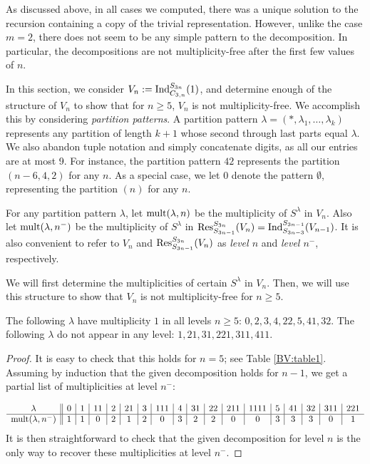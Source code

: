 As discussed above, in all cases we computed, there was a unique
solution to the recursion containing a copy of the trivial representation.
However, unlike the case $m=2$, there does not seem to be any simple pattern to the decomposition.
In particular, the decompositions are not multiplicity-free after the first few values of $n$.

In this section, we consider $V_n := \textup{Ind}_{C_{3,n}}^{S_{3n}}(1)$, and determine enough of the structure of $V_n$ to show that
for $n \ge 5$, $V_n$ is not multiplicity-free. We accomplish this by considering {\em partition patterns}. A partition pattern $\lambda = (*,\lambda_1,\ldots,\lambda_k)$ represents any partition of length $k+1$ whose second through last parts equal $\lambda$. We also abandon tuple notation and simply concatenate digits, as all our entries are at most 9. For instance, the partition pattern $42$ represents the partition $(n-6,4,2)$ for any $n$. As a special case, we let $0$ denote the pattern $\emptyset$, representing the partition $(n)$ for any $n$.

For any partition pattern $\lambda$, let $\textup{mult}(\lambda,n)$ be the multiplicity of $S^\lambda$ in $V_n$. Also let $\textup{mult}(\lambda,n^-)$ be the multiplicity of $S^\lambda$ in $\textup{Res}^{S_{3n}}_{S_{3n-1}}(V_n) = \textup{Ind}_{S_{3n-3}}^{S_{3n-1}}(V_{n-1})$. It is also convenient to refer to $V_n$ and $\textup{Res}^{S_{3n}}_{S_{3n-1}}(V_n)$ as {\em level $n$} and {\em level $n^-$}, respectively. 

We will first determine the multiplicities of certain $S^\lambda$ in $V_n$. Then, we will use this structure to show that $V_n$ is not multiplicity-free for
$n \ge 5$.


\begin{lemma}\label{BV:inductivelemma}
The following $\lambda$ have multiplicity $1$ in all levels $n \ge 5$: 
$0,2,3,4,22,5,41,32$. The following $\lambda$ do not appear in any level: $1,21,31,221,311,411$.
\end{lemma}
\begin{proof}
It is easy to check that this holds for $n=5$; see Table \ref{BV:table1}. Assuming by induction that the
given decomposition holds for $n-1$, we get a partial list of multiplicities
at level $n^-$:


$$
\begin{array}{c||c|c|c|c|c|c|c|c|c|c|c|c|c|c|c|c|c}
\lambda &0&1&11&2&21&3&111&4&31&22&211&1111&5&41&32&311&221 \\ \hline
\textup{mult}(\lambda,n^-)&1&1&0&2&1&2&0&3&2&2&0&0&3&3&3&0&1
\end{array}
$$
It is then straightforward to check that
the given decomposition for level $n$ is the only way to recover these multiplicities at level $n^-$.
\end{proof}


